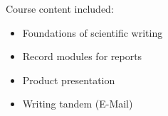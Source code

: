Course content included:
\begin{itemize}
    \item Foundations of scientific writing
    \item Record modules for reports
    \item Product presentation
    \item Writing tandem (E-Mail)
\end{itemize}